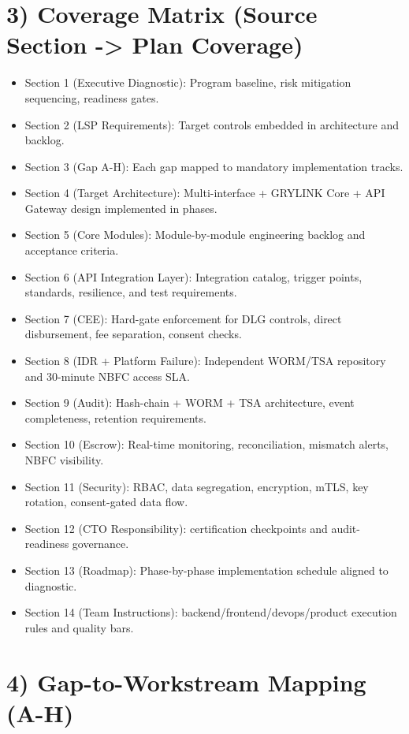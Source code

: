 ﻿\documentclass[12pt]{article}
\begin{document}
\section{3) Coverage Matrix (Source Section -> Plan Coverage)}


\begin{itemize}
\item Section 1 (Executive Diagnostic): Program baseline, risk mitigation sequencing, readiness gates.
\item Section 2 (LSP Requirements): Target controls embedded in architecture and backlog.
\item Section 3 (Gap A-H): Each gap mapped to mandatory implementation tracks.
\item Section 4 (Target Architecture): Multi-interface + GRYLINK Core + API Gateway design implemented in phases.
\item Section 5 (Core Modules): Module-by-module engineering backlog and acceptance criteria.
\item Section 6 (API Integration Layer): Integration catalog, trigger points, standards, resilience, and test requirements.
\item Section 7 (CEE): Hard-gate enforcement for DLG controls, direct disbursement, fee separation, consent checks.
\item Section 8 (IDR + Platform Failure): Independent WORM/TSA repository and 30-minute NBFC access SLA.
\item Section 9 (Audit): Hash-chain + WORM + TSA architecture, event completeness, retention requirements.
\item Section 10 (Escrow): Real-time monitoring, reconciliation, mismatch alerts, NBFC visibility.
\item Section 11 (Security): RBAC, data segregation, encryption, mTLS, key rotation, consent-gated data flow.
\item Section 12 (CTO Responsibility): certification checkpoints and audit-readiness governance.
\item Section 13 (Roadmap): Phase-by-phase implementation schedule aligned to diagnostic.
\item Section 14 (Team Instructions): backend/frontend/devops/product execution rules and quality bars.
\end{itemize}

\section{4) Gap-to-Workstream Mapping (A-H)}
\end{document}
